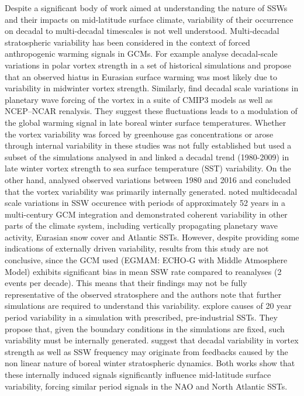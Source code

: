 \documentclass[wcd, manuscript]{copernicus}
\begin{document}
Despite a significant body of work aimed at understanding the nature of SSWs and their impacts on mid-latitude surface climate, variability of their occurrence on decadal to multi-decadal timescales is not well understood. Multi-decadal stratospheric variability has been considered in the context of forced anthropogenic warming signals in GCMs. For example \cite{Garfinkel2017} analyse decadal-scale variations in polar vortex strength in a set of historical simulations and propose that an observed hiatus in Eurasian surface warming was most likely due to variability in midwinter vortex strength. Similarly, \cite{cohen2009} find decadal scale variations in planetary wave forcing of the vortex in a suite of CMIP3 models as well as NCEP–NCAR renalysis. They suggest these fluctuations leads to a modulation of the global warming signal in late boreal winter surface temperatures. Whether the vortex variability was forced by greenhouse gas concentrations or arose through internal variability in these studies was not fully established but \cite{Garfinkel2015} used a subset of the simulations analysed in \cite{Garfinkel2017} and linked a decadal trend (1980-2009) in late winter vortex strength to sea surface temperature (SST) variability. On the other hand, \cite{Seviour2017} analysed observed variations between 1980 and 2016 and concluded that the vortex variability was primarily internally generated. \cite{Schimanke2011} noted  multidecadal scale variations in SSW occurence with periods of approximately 52 years in a multi-century GCM integration and demonstrated coherent variability in other parts of the climate system, including vertically propagating planetary wave activity, Eurasian snow cover and Atlantic SSTs. However, despite providing some indications of externally driven variability, results from this study are not conclusive, since the GCM used (EGMAM: ECHO‐G with Middle Atmosphere Model) exhibits significant bias in mean SSW rate compared to reanalyses (2 events per decade). This means that their findings may not be fully representative of the observed stratosphere and the authors note that further simulations are required to understand this variability. \cite{Manzini2012} explore causes of 20 year period variability in a simulation with prescribed, pre-industrial SSTs. They propose that, given the boundary conditions in the simulations are fixed, such variability must be internally generated. \cite{Butchart2000} suggest that decadal variability in vortex strength as well as SSW frequency may originate from feedbacks caused by the non linear nature of boreal winter stratospheric dynamics. Both works show that these internally induced signals significantly influence mid-latitude surface variability, forcing similar period signals in the NAO and North Atlantic SSTs.
\end{document}
